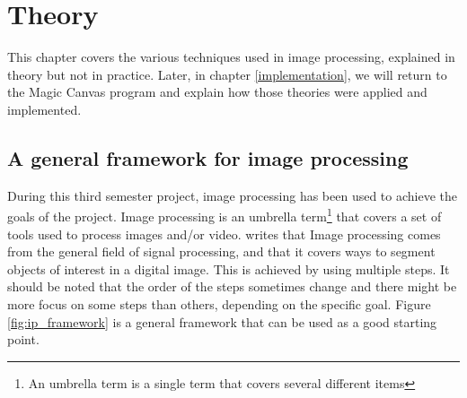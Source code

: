 \chapter{Theory}\label{theory_part}
This chapter covers the various techniques used in image processing, explained in theory but not in practice. Later, in chapter \ref{implementation}, we will return to the Magic Canvas program and explain how those theories were applied and implemented.

\section{A general framework for image processing}
During this third semester project, image processing has been used to achieve the goals of the project.
Image processing is an umbrella term\footnote{An umbrella term is a single term that covers several  different items} that covers a set of tools used to process images and/or video. \citep{ip_book} writes that Image processing comes from the general field of signal processing, and that it covers ways to segment objects of interest in a digital image. This is achieved by using multiple steps. It should be noted that the order of the steps sometimes change and there might be more focus on some steps than others, depending on the specific goal. Figure \ref{fig:ip_framework} is a general framework that can be used as a good starting point.






